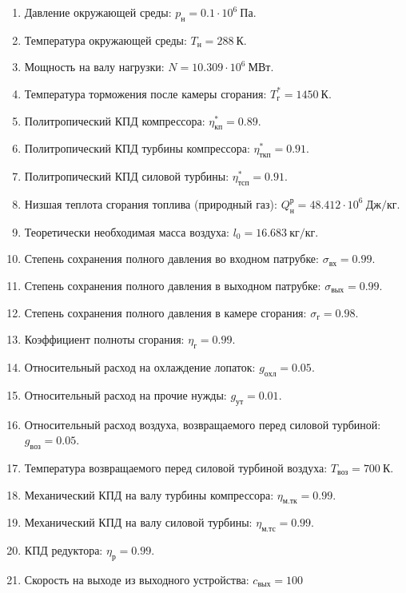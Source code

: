 \documentclass[a4paper,10pt]{article}
\begin{document}
    
\begin{enumerate}

	\item Давление окружающей среды: $p_{н} = 0.1 \cdot 10^6\ Па$.
	\item Температура окружающей среды: $T_{н} = 288\ К$.
	\item Мощность на валу нагрузки: $ N = 10.309 \cdot 10^6\ МВт $.
	\item Температура торможения после камеры сгорания: $T_г^* = 1450\ К$.
	\item Политропический КПД компрессора: $\eta^*_{к п} = 0.89 $.
	\item Политропический КПД турбины компрессора: $\eta^*_{ткп} = 0.91$.
	\item Политропический КПД силовой турбины: $\eta^*_{тсп} = 0.91$.
	\item Низшая теплота сгорания топлива (природный газ): $Q^р_н = 48.412 \cdot 10^6\ Дж/кг$.
	\item Теоретически необходимая масса воздуха: $l_0 = 16.683\ кг/кг$.

	\item Степень сохранения полного давления во входном патрубке: $\sigma_{вх} = 0.99$.
	\item Степень сохранения полного давления в выходном патрубке: $\sigma_{вых} = 0.99$.
	\item Степень сохранения полного давления в камере сгорания: $\sigma_г = 0.98$.
	\item Коэффициент полноты сгорания: $\eta_г = 0.99 $.
	\item Относительный расход на охлаждение лопаток: $g_{охл} = 0.05$.
	\item Относительный расход на прочие нужды: $g_{ут} = 0.01$.
	\item Относительный расход воздуха, возвращаемого перед силовой турбиной: $g_{воз} = 0.05$.
	\item Температура возвращаемого перед силовой турбиной воздуха: $T_{воз} = 700\ К$.
	\item Механический КПД на валу турбины компрессора: $\eta_{м.тк} = 0.99$.
	\item Механический КПД на валу силовой турбины: $\eta_{м.тс} = 0.99$.
	\item КПД редуктора: $ \eta_р = 0.99$.
	\item Скорость на выходе из выходного устройства: $ c_{вых} = 100 $

\end{enumerate}
\end{document}
